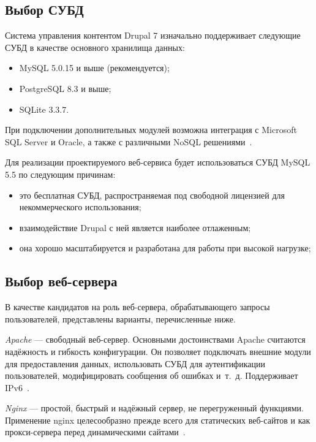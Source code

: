 \subsection{Выбор СУБД}
\label{ssec:choice_db}

Система управления контентом Drupal 7 изначально поддерживает следующие СУБД 
в качестве основного хранилища данных:
\begin{itemize} 
\item
  MySQL 5.0.15 и выше (рекомендуется);

\item
  PostgreSQL 8.3 и выше;

\item
  SQLite 3.3.7.
\end{itemize}

При подключении дополнительных модулей возможна интеграция с Microsoft SQL Server и Oracle,
а также с различными NoSQL решениями~\cite{drupal_database}.

Для реализации проектируемого веб-сервиса будет использоваться СУБД MySQL 5.5 по следующим причинам:
\begin{itemize}
\item
  это бесплатная СУБД, распространяемая под свободной лицензией для некоммерческого использования;
\item
  взаимодействие Drupal с ней является наиболее отлаженным;
\item
  она хорошо масштабируется и разработана для работы при высокой нагрузке;
\end{itemize}

\subsection{Выбор веб-сервера}
\label{ssec:choice_web-server}

В качестве кандидатов на роль веб-сервера, обрабатывающего запросы пользователей,
представлены варианты, перечисленные ниже.

\textit{Apache} --- свободный веб-сервер. Основными достоинствами Apache считаются надёжность и гибкость конфигурации.
Он позволяет подключать внешние модули для предоставления данных, использовать 
СУБД для аутентификации пользователей, модифицировать сообщения об ошибках
и~т.~д. Поддерживает IPv6~\cite{wiki_apache}.

\textit{Nginx} --- простой, быстрый и надёжный сервер, не перегруженный функциями.
Применение nginx целесообразно прежде всего для статических веб-сайтов
и как прокси-сервера перед динамическими сайтами~\cite{wiki_nginx}.

